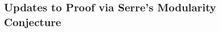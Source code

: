 \documentclass{article}
\theoremstyle{definition}
\theoremstyle{definition}
\theoremstyle{definition}
\begin{document}
\begin{itemize}



\end{itemize}


\subsection{Updates to Proof via Serre’s Modularity Conjecture}
\end{document}
